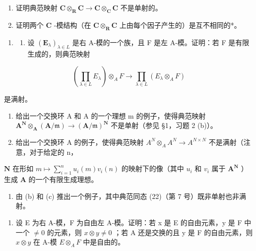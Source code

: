 \begin{enumerate}
\def\labelenumi{(\alph{enumi})}
\item
  证明典范映射 \(\mathbf{C} \otimes_{\mathbf{R}} \mathbf{C} \to \mathbf{C} \otimes_{\mathbf{C}} \mathbf{C}\) 不是单射的。
\item
  证明两个 \(\mathbf{C}\) -模结构（在 \(\mathbf{C} \otimes_{\mathbf{R}} \mathbf{C}\) 上由每个因子产生的）是互不相同的*。
\end{enumerate}

\begin{enumerate}
\def\labelenumi{\arabic{enumi}.}
\setcounter{enumi}{2}
\tightlist
\item
  \begin{enumerate}
  \def\labelenumii{(\alph{enumii})}
  \tightlist
  \item
    设 \((\mathbf{E}_{\lambda})_{\lambda \in L}\) 是右 A-模的一个族，且 F 是左 A-模。证明：若 F 是有限生成的，则典范映射
  \end{enumerate}
\end{enumerate}

\[
\left(\prod_ {\lambda \in L} E _ {\lambda}\right) \otimes_ {A} F \rightarrow \prod_ {\lambda \in L} (E _ {\lambda} \otimes_ {A} F)
\]

是满射。

\begin{enumerate}
\def\labelenumi{(\alph{enumi})}
\setcounter{enumi}{1}
\item
  给出一个交换环 A 和 A 的一个理想 m 的例子，使得典范映射 \(\mathbf{A}^{\mathbf{N}}\otimes_{\mathbf{A}}(\mathbf{A}/\mathfrak{m})\to(\mathbf{A}/\mathfrak{m})^{\mathbf{N}}\) 不是单射（参见 §1，习题 2 (b)）。
\item
  给出一个交换环 A 的例子，使得典范映射 \(A^{N} \otimes_{A} A^{N} \to A^{N \times N}\) 不是满射（注意，对于给定的 n，
\end{enumerate}

\(\mathbf{N}\) 在形如 \(m \mapsto \sum_{i=1}^{n} u_i(m)v_i(n)\) 的映射下的像（其中 \(u_i\) 和 \(v_i\) 属于 \(\mathbf{A}^{\mathbf{N}}\) ）生成 \(\mathbf{A}\) 的一个有限生成理想。

\begin{enumerate}
\def\labelenumi{(\alph{enumi})}
\setcounter{enumi}{3}
\tightlist
\item
  由 (b) 和 (c) 推出一个例子，其中典范同态 (22)（第 7 号）既非单射也非满射。
\end{enumerate}

\begin{enumerate}
\def\labelenumi{\arabic{enumi}.}
\setcounter{enumi}{3}
\tightlist
\item
  设 E 为右 A-模，F 为自由左 A-模。证明：若 x 是 E 的自由元素，y 是 F 中一个 \(\neq0\) 的元素，则 \(x\otimes y\neq0\) ；若 A 还是交换的且 y 是 F 的自由元素，则 \(x\otimes y\) 在 A-模 \(E\otimes_{A}F\) 中是自由的。
\end{enumerate}

